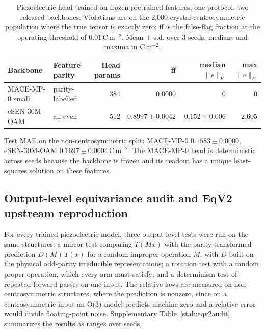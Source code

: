 \begin{table}[htbp]
\centering
\caption{Piezoelectric head trained on frozen pretrained features, one protocol, two released backbones. Violations are on the 2,000-crystal centrosymmetric population where the true tensor is exactly zero; ff is the false-flag fraction at the operating threshold of $0.01$\,C\,m$^{-2}$. Mean $\pm$ s.d. over 3 seeds; medians and maxima in C\,m$^{-2}$.}
\label{stab:frozen}
\begin{tabular*}{\textwidth}{@{\extracolsep{\fill}}llrrrr@{}}
\toprule
Backbone & Feature parity & Head params & ff & median $\lVert e \rVert_F$ & max $\lVert e \rVert_F$ \\
\midrule
MACE-MP-0 small & parity-labelled & 384 & $0.0000$ & $0$ & $0$ \\
eSEN-30M-OAM & all-even & 512 & $0.8997 \pm 0.0042$ & $0.152 \pm 0.006$ & $2.605$ \\
\bottomrule
\end{tabular*}

\vspace{2pt}
{\fontsize{7bp}{8.5bp}\selectfont
Test MAE on the non-centrosymmetric split: MACE-MP-0 $0.1583 \pm 0.0000$, eSEN-30M-OAM $0.1697 \pm 0.0004$\,C\,m$^{-2}$. The MACE-MP-0 head is deterministic across seeds because the backbone is frozen and its readout has a unique least-squares solution on these features.\par}
\end{table}


\subsection*{Output-level equivariance audit and EqV2 upstream reproduction}\label{snote:eqv2}

For every trained piezoelectric model, three output-level tests were run on the same structures: a mirror test comparing $T(Mx)$ with the parity-transformed prediction $D(M)\,T(x)$ for a random improper operation $M$, with $D$ built on the physical odd-parity irreducible representations; a rotation test with a random proper operation, which every arm must satisfy; and a determinism test of repeated forward passes on one input. The relative laws are measured on non-centrosymmetric structures, where the prediction is nonzero, since on a centrosymmetric input an O(3) model predicts machine zero and a relative error would divide floating-point noise. Supplementary Table~\ref{stab:eqv2audit} summarizes the results as ranges over seeds.

